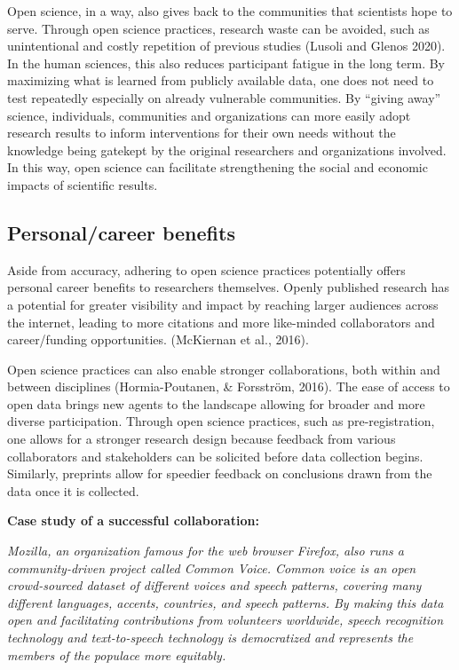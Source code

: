 \documentclass[
  letterpaper,
  DIV=11,
  numbers=noendperiod]{scrreport}
\begin{document}
Open science, in a way, also gives back to the communities that
scientists hope to serve. Through open science practices, research waste
can be avoided, such as unintentional and costly repetition of previous
studies (Lusoli and Glenos 2020). In the human sciences, this also
reduces participant fatigue in the long term. By maximizing what is
learned from publicly available data, one does not need to test
repeatedly especially on already vulnerable communities. By ``giving
away'' science, individuals, communities and organizations can more
easily adopt research results to inform interventions for their own
needs without the knowledge being gatekept by the original researchers
and organizations involved. In this way, open science can facilitate
strengthening the social and economic impacts of scientific results.

\hypertarget{personalcareer-benefits}{%
\subsection{Personal/career benefits}\label{personalcareer-benefits}}

Aside from accuracy, adhering to open science practices potentially
offers personal career benefits to researchers themselves. Openly
published research has a potential for greater visibility and impact by
reaching larger audiences across the internet, leading to more citations
and more like-minded collaborators and career/funding opportunities.
(McKiernan et al., 2016).

Open science practices can also enable stronger collaborations, both
within and between disciplines (Hormia-Poutanen, \& Forsström, 2016).
The ease of access to open data brings new agents to the landscape
allowing for broader and more diverse participation. Through open
science practices, such as pre-registration, one allows for a stronger
research design because feedback from various collaborators and
stakeholders can be solicited before data collection begins. Similarly,
preprints allow for speedier feedback on conclusions drawn from the data
once it is collected.

\textbf{Case study of a successful collaboration:}

\emph{Mozilla, an organization famous for the web browser Firefox, also
runs a community-driven project called Common Voice. Common voice is an
open crowd-sourced dataset of different voices and speech patterns,
covering many different languages, accents, countries, and speech
patterns. By making this data open and facilitating contributions from
volunteers worldwide, speech recognition technology and text-to-speech
technology is democratized and represents the members of the populace
more equitably.}
\end{document}

